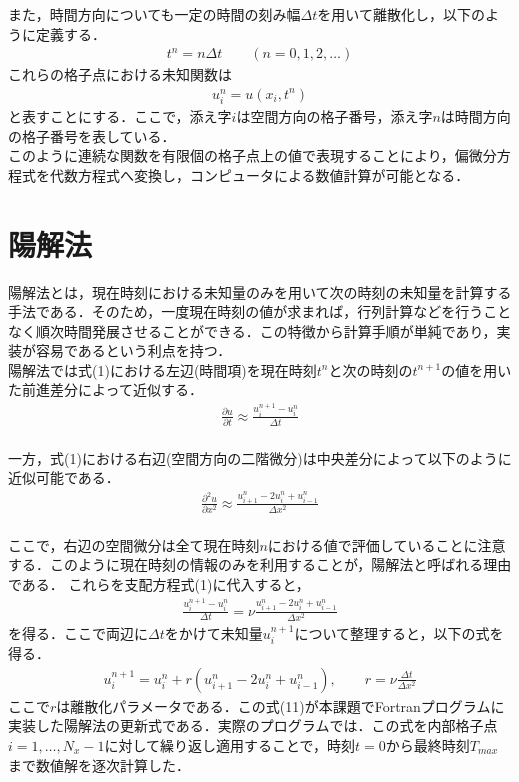 \documentclass[dvipdfmx]{jsarticle}
\begin{document}
また，時間方向についても一定の時間の刻み幅$\Delta t$を用いて離散化し，以下のように定義する．
\begin{align}
  t^n = n \Delta t \qquad (n = 0,1,2,\dots)
\end{align}
これらの格子点における未知関数は
\begin{align}
  u^n_i = u(x_i,t^n)
\end{align}
と表すことにする．ここで，添え字$i$は空間方向の格子番号，添え字$n$は時間方向の格子番号を表している．\\
このように連続な関数を有限個の格子点上の値で表現することにより，偏微分方程式を代数方程式へ変換し，コンピュータによる数値計算が可能となる．

\section{陽解法}
陽解法とは，現在時刻における未知量のみを用いて次の時刻の未知量を計算する手法である．そのため，一度現在時刻の値が求まれば，行列計算などを行うことなく順次時間発展させることができる．この特徴から計算手順が単純であり，実装が容易であるという利点を持つ．\\

陽解法では式(1)における左辺(時間項)を現在時刻$t^n$と次の時刻の$t^{n+1}$の値を用いた前進差分によって近似する．
\begin{align}
  \frac{\partial u}{\partial t} \approx \frac{u_i^{n+1}-u_i^n}{\Delta t}
\end{align}\\

一方，式(1)における右辺(空間方向の二階微分)は中央差分によって以下のように近似可能である．
\begin{align}
  \frac{\partial^2 u}{\partial x^2} \approx \frac{u_{i+1}^n - 2 u_i^n + u_{i-1}^n}{\Delta x^2}
\end{align}\\

ここで，右辺の空間微分は全て現在時刻$n$における値で評価していることに注意する．このように現在時刻の情報のみを利用することが，陽解法と呼ばれる理由である．
これらを支配方程式(1)に代入すると，
\begin{align}
  \frac{u_i^{n+1}-u_i^n}{\Delta t} = \nu \frac{u_{i+1}^n - 2 u_i^n + u_{i-1}^n}{\Delta x^2}
\end{align}
を得る．ここで両辺に$\Delta t$をかけて未知量$u_i^{n+1}$について整理すると，以下の式を得る．
\begin{align}
  u_i^{n+1} = u_i^n + r(u_{i+1}^n - 2u_i^n + u_{i-1}^n) , \qquad r = \nu \frac{\Delta t}{\Delta x^2}
\end{align}
ここで$r$は離散化パラメータである．この式(11)が本課題でFortranプログラムに実装した陽解法の更新式である．実際のプログラムでは．この式を内部格子点$i=1,\dots,N_x-1$に対して繰り返し適用することで，時刻$t=0$から最終時刻$T_{max}$まで数値解を逐次計算した．\\
\end{document}
